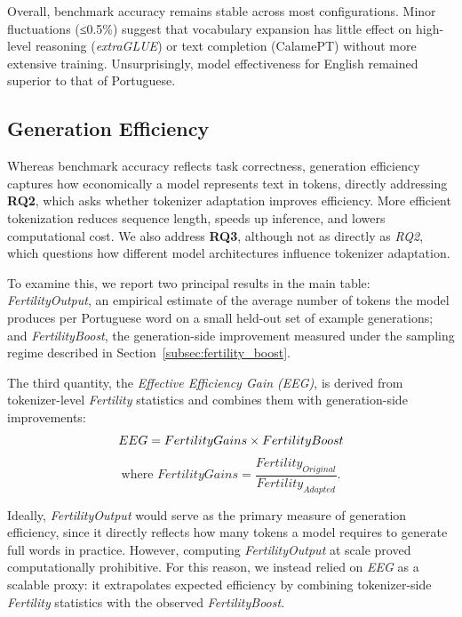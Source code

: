 Overall, benchmark accuracy remains stable across most configurations. Minor fluctuations (≤0.5\%) suggest that vocabulary expansion has little effect on high-level reasoning (\emph{extraGLUE}) or text completion (CalamePT) without more extensive training. Unsurprisingly, model effectiveness for English remained superior to that of Portuguese.



\subsection{Generation Efficiency}
\label{sec:gen_efficiency}

Whereas benchmark accuracy reflects task correctness, generation efficiency captures how economically a model represents text in tokens, directly addressing \textbf{RQ2}, which asks whether tokenizer adaptation improves efficiency. More efficient tokenization reduces sequence length, speeds up inference, and lowers computational cost. 
We also address \textbf{RQ3}, although not as directly as \textit{RQ2}, which questions how different model architectures influence tokenizer adaptation.

To examine this, we report two principal results in the main table: \textit{FertilityOutput}, an empirical estimate of the average number of tokens the model produces per Portuguese word on a small held-out set of example generations; and \textit{FertilityBoost}, the generation-side improvement measured under the sampling regime described in Section~\ref{subsec:fertility_boost}.

The third quantity, the \textit{Effective Efficiency Gain (EEG)}, is derived from tokenizer-level \textit{Fertility} statistics and combines them with generation-side improvements:
\begin{equation}
    EEG = FertilityGains \times FertilityBoost \\
\end{equation}
$$
    \text{where } FertilityGains = \frac{Fertility_{Original}}{Fertility_{Adapted}}.
$$

Ideally, \textit{FertilityOutput} would serve as the primary measure of generation efficiency, since it directly reflects how many tokens a model requires to generate full words in practice. However, computing \textit{FertilityOutput} at scale proved computationally prohibitive. For this reason, we instead relied on \textit{EEG} as a scalable proxy: it extrapolates expected efficiency by combining tokenizer-side \textit{Fertility} statistics with the observed \textit{FertilityBoost}.

